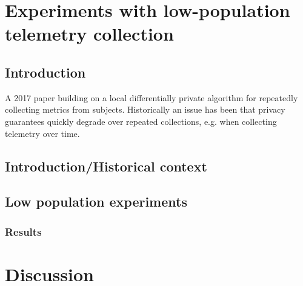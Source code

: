 \documentclass[12pt]{article}
\begin{document}
\section{Experiments with low-population telemetry collection}

\subsection{Introduction}

A 2017 paper building on a local differentially private algorithm for repeatedly collecting metrics from subjects. Historically an issue has been that privacy guarantees quickly degrade over repeated collections, e.g. when collecting telemetry over time.

\subsection{Introduction/Historical context}

\subsection{Low population experiments}

\subsubsection{Results}

\section{Discussion}

\end{document}
